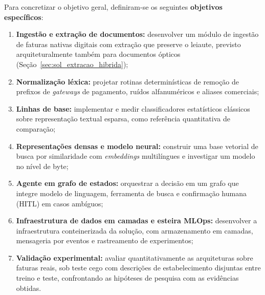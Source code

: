 Para concretizar o objetivo geral, definiram-se os seguintes \textbf{objetivos específicos}:

\begin{enumerate}
	\item \textbf{Ingestão e extração de documentos:} desenvolver um módulo de ingestão de faturas nativas digitais com extração que preserve o leiaute, previsto arquiteturalmente também para documentos ópticos (Seção~\ref{sec:sol_extracao_hibrida});
	\item \textbf{Normalização léxica:} projetar rotinas determinísticas de remoção de prefixos de \textit{gateways} de pagamento, ruídos alfanuméricos e aliases comerciais;
	\item \textbf{Linhas de base:} implementar e medir classificadores estatísticos clássicos sobre representação textual esparsa, como referência quantitativa de comparação;
	\item \textbf{Representações densas e modelo neural:} construir uma base vetorial de busca por similaridade com \textit{embeddings} multilíngues e investigar um modelo no nível de byte;
	\item \textbf{Agente em grafo de estados:} orquestrar a decisão em um grafo que integre modelo de linguagem, ferramenta de busca e confirmação humana (HITL) em casos ambíguos;
	\item \textbf{Infraestrutura de dados em camadas e esteira MLOps:} desenvolver a infraestrutura conteinerizada da solução, com armazenamento em camadas, mensageria por eventos e rastreamento de experimentos;
	\item \textbf{Validação experimental:} avaliar quantitativamente as arquiteturas sobre faturas reais, sob teste cego com descrições de estabelecimento disjuntas entre treino e teste, confrontando as hipóteses de pesquisa com as evidências obtidas.
\end{enumerate}

